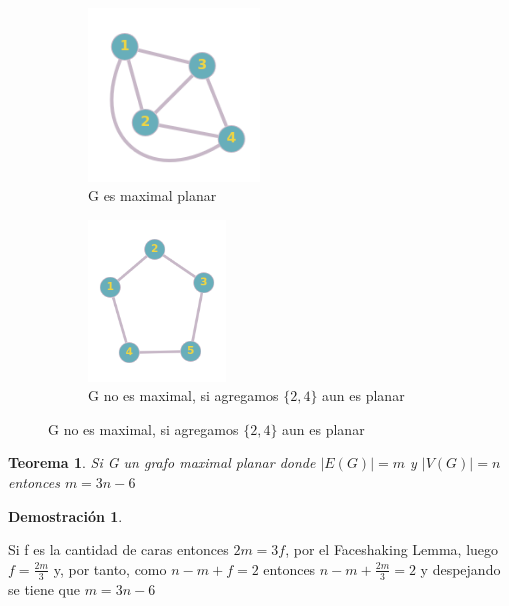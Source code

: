 \documentclass[a4paper,1pt]{report}
\newtheorem*{teo}{Teorema}
\newtheorem*{dem}{Demostración}
\begin{document}
\begin{figure}[H]
    \centering
    \begin{subfigure}[b]{0.45\textwidth}
    \centering
    \includegraphics[width=0.5\textwidth]{figures5/Gplanar.png}
    \caption{G es maximal planar}
\end{subfigure}
\begin{subfigure}[b]{0.45\textwidth}
    \centering
    \includegraphics[width=0.4\textwidth]{figures5/C5.png}
    \caption{G no es maximal, si agregamos $\{2,4\}$ aun es planar}
\end{subfigure}
\end{figure} 

\begin{teo}
 Si G un grafo maximal planar donde $|E(G)|=m$  y $|V(G)|=n$ entonces $m=3n-6$
\end{teo}

\begin{dem}
 
\end{dem}

Si f es la cantidad de caras entonces $2m=3f$, por el Faceshaking Lemma, luego  
$f = \frac{2m}{3}$ y, por tanto, como $n-m+f=2$ entonces $n-m + \frac{2m}{3} = 2$ y despejando se tiene que $m=3n-6$
\end{document}
